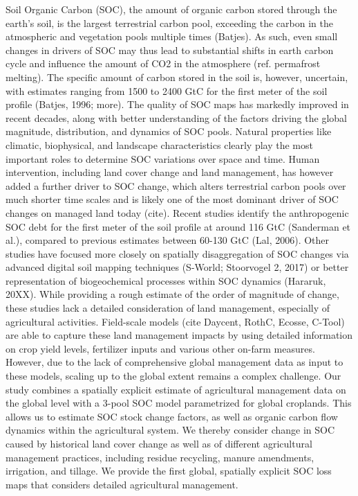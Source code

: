 \documentclass[gc, manuscript]{copernicus}
\begin{document}


\newpage

\introduction

Soil Organic Carbon (SOC), the amount of organic carbon stored through the earth's soil, is the largest terrestrial carbon pool, exceeding the carbon in the atmospheric and vegetation pools multiple times (Batjes). As such, even small changes in drivers of SOC may thus lead to substantial shifts in earth carbon cycle and influence the amount of CO2 in the atmosphere (ref. permafrost melting). The specific amount of carbon stored in the soil is, however, uncertain, with estimates ranging from 1500 to 2400 GtC for the first meter of the soil profile (Batjes, 1996; more). The quality of SOC maps has markedly improved in recent decades, along with better understanding of the factors driving the global magnitude, distribution, and dynamics of SOC pools. Natural properties like climatic, biophysical, and landscape characteristics clearly play the most important roles to determine SOC variations over space and time.
Human intervention, including land cover change and land management, has however added a further driver to SOC change, which alters terrestrial carbon pools over much shorter time scales and is likely one of the most dominant driver of SOC changes on managed land today (cite). Recent studies identify the anthropogenic SOC debt for the first meter of the soil profile at around 116 GtC (Sanderman et al.), compared to previous estimates between 60-130 GtC (Lal, 2006). Other studies have focused more closely on spatially disaggregation of SOC changes via advanced digital soil mapping techniques (S-World; Stoorvogel 2, 2017) or better representation of biogeochemical processes within SOC dynamics (Hararuk, 20XX). While providing a rough estimate of the order of magnitude of change, these studies lack a detailed consideration of land management, especially of agricultural activities.
Field-scale models (cite Daycent, RothC, Ecosse, C-Tool) are able to capture these land management impacts by using detailed information on crop yield levels, fertilizer inputs and various other on-farm measures. However, due to the lack of comprehensive global management data as input to these models, scaling up to the global extent remains a complex challenge. Our study combines a spatially explicit estimate of agricultural management data on the global level with a 3-pool SOC model parametrized for global croplands. This allows us to estimate SOC stock change factors, as well as organic carbon flow dynamics within the agricultural system. We thereby consider change in SOC caused by historical land cover change as well as of different agricultural management practices, including residue recycling, manure amendments, irrigation, and tillage. We provide the first global, spatially explicit SOC loss maps that considers detailed agricultural management.
\end{document}
